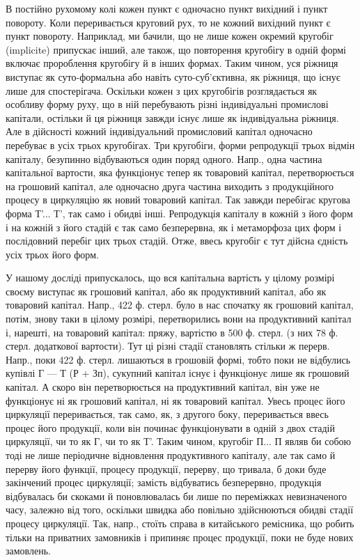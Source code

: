 В постійно рухомому колі кожен пункт є одночасно пункт вихідний
і пункт повороту. Коли переривається круговий рух, то не кожний
вихідний пункт є пункт повороту. Наприклад, ми бачили, що не лише
кожен окремий кругобіг (implicite) припускає інший, але також, що
повторення кругобігу в одній формі включає пророблення кругобігу й
в інших формах. Таким чином, уся ріжниця виступає як суто-формальна
або навіть суто-суб’єктивна, як ріжниця, що існує лише для спостерігача.
Оскільки кожен з цих кругобігів розглядається як особливу форму
руху, що в ній перебувають різні індивідуальні промислові капітали, остільки
й ця ріжниця завжди існує лише як індивідуальна ріжниця. Але в дійсності
кожний індивідуальний промисловий капітал одночасно перебуває
в усіх трьох кругобігах. Три кругобіги, форми репродукції трьох відмін
капіталу, безупинно відбуваються один поряд одного. Напр., одна частина
капітальної вартости, яка функціонує тепер як товаровий капітал, перетворюється
на грошовий капітал, але одночасно друга частина виходить
з продукційного процесу в циркуляцію як новий товаровий капітал. Так
завжди перебігає кругова форма Т'... Т', так само і обидві інші. Репродукція
капіталу в кожній з його форм і на кожній з його стадій
є так само безперервна, як і метаморфоза цих форм і послідовний перебіг
цих трьох стадій. Отже, ввесь кругобіг є тут дійсна єдність усіх трьох
його форм.

У нашому досліді припускалось, що вся капітальна вартість у цілому розмірі
своєму виступає як грошовий капітал, або як продуктивний капітал, або як
товаровий капітал. Напр., 422 ф. стерл. було в нас спочатку як грошовий
капітал, потім, знову таки в цілому розмірі, перетворились вони на
продуктивний капітал і, нарешті, на товаровий капітал: пряжу, вартістю
в 500 ф. стерл. (з них 78 ф. стерл. додаткової вартости). Тут ці різні
стадії становлять стільки ж перерв. Напр., поки 422 ф. стерл. лишаються
в грошовій формі, тобто поки не відбулись купівлі Г — Т (Р + Зп),
сукупний капітал існує і функціонує лише як грошовий капітал. А скоро
він перетворюється на продуктивний капітал, він уже не функціонує ні
як грошовий капітал, ні як товаровий капітал. Увесь процес його циркуляції
переривається, так само, як, з другого боку, переривається ввесь
процес його продукції, коли він починає функціонувати в одній з двох
стадій циркуляції, чи то як Г, чи то як Т'. Таким чином, кругобіг П... П
являв би собою тоді не лише періодичне відновлення продуктивного
капіталу, але так само й перерву його функції, процесу продукції, перерву,
що тривала, б доки буде закінчений процес циркуляції; замість відбуватись
безперервно, продукція відбувалась би скоками й поновлювалась би лише
по переміжках невизначеного часу, залежно від того, оскільки швидка
або повільно здійснюються обидві стадії процесу циркуляції. Так, напр.,
стоїть справа в китайського ремісника, що робить тільки на приватних
замовників і припиняє процес продукції, поки не буде нових замовлень.

